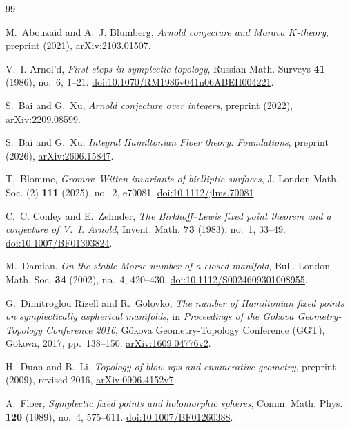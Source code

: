 \begin{thebibliography}{99}

M.~Abouzaid and A.~J. Blumberg,
\emph{Arnold conjecture and Morava $K$-theory},
preprint (2021), \href{https://arxiv.org/abs/2103.01507}{arXiv:2103.01507}.

V.~I. Arnol'd,
\emph{First steps in symplectic topology},
Russian Math. Surveys \textbf{41} (1986), no.~6, 1--21.
\href{https://doi.org/10.1070/RM1986v041n06ABEH004221}{doi:10.1070/RM1986v041n06ABEH004221}.

S.~Bai and G.~Xu,
\emph{Arnold conjecture over integers},
preprint (2022), \href{https://arxiv.org/abs/2209.08599}{arXiv:2209.08599}.

S.~Bai and G.~Xu,
\emph{Integral Hamiltonian Floer theory: Foundations},
preprint (2026), \href{https://arxiv.org/abs/2606.15847}{arXiv:2606.15847}.

T.~Blomme,
\emph{Gromov--Witten invariants of bielliptic surfaces},
J. London Math. Soc. (2) \textbf{111} (2025), no.~2, e70081.
\href{https://doi.org/10.1112/jlms.70081}{doi:10.1112/jlms.70081}.

C.~C. Conley and E.~Zehnder,
\emph{The Birkhoff--Lewis fixed point theorem and a conjecture of V.~I. Arnold},
Invent. Math. \textbf{73} (1983), no.~1, 33--49.
\href{https://doi.org/10.1007/BF01393824}{doi:10.1007/BF01393824}.

M.~Damian,
\emph{On the stable Morse number of a closed manifold},
Bull. London Math. Soc. \textbf{34} (2002), no.~4, 420--430.
\href{https://doi.org/10.1112/S0024609301008955}{doi:10.1112/S0024609301008955}.

G.~Dimitroglou Rizell and R.~Golovko,
\emph{The number of Hamiltonian fixed points on symplectically aspherical manifolds},
in \emph{Proceedings of the G\"okova Geometry-Topology Conference 2016},
G\"okova Geometry-Topology Conference (GGT), G\"okova, 2017, pp.~138--150.
\href{https://arxiv.org/abs/1609.04776v2}{arXiv:1609.04776v2}.

H.~Duan and B.~Li,
\emph{Topology of blow-ups and enumerative geometry},
preprint (2009), revised 2016,
\href{https://arxiv.org/abs/0906.4152v7}{arXiv:0906.4152v7}.

A.~Floer,
\emph{Symplectic fixed points and holomorphic spheres},
Comm. Math. Phys. \textbf{120} (1989), no.~4, 575--611.
\href{https://doi.org/10.1007/BF01260388}{doi:10.1007/BF01260388}.


\end{thebibliography}
